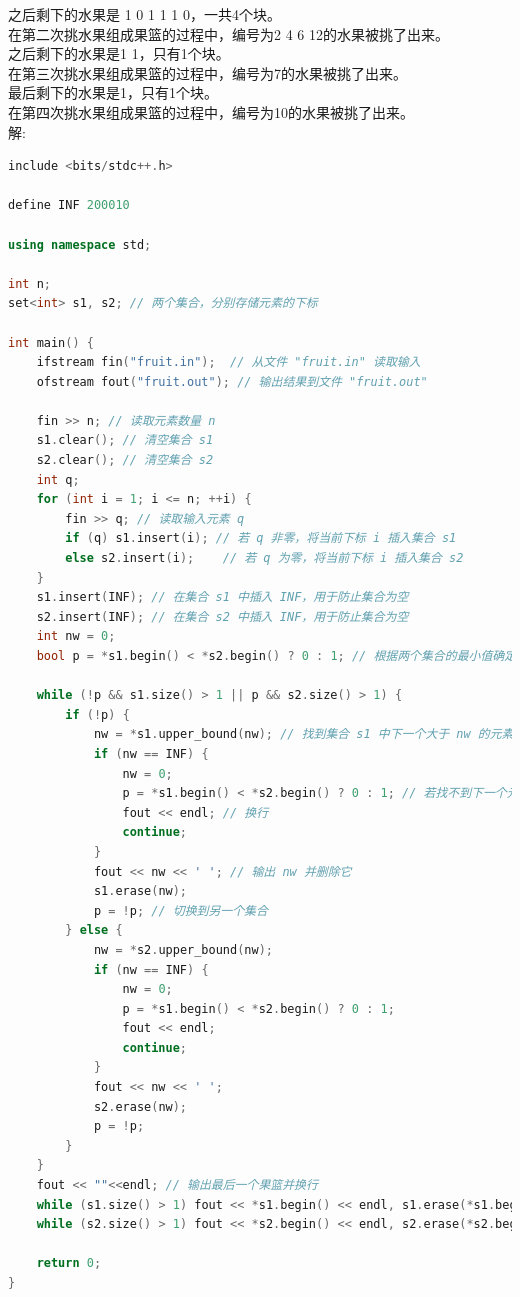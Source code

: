 \documentclass[12pt,twiside,a4paper]{ctexbook}
\numberwithin{chapter}{part}
\begin{document}
之后剩下的水果是 1 0 1 1 1 0，一共4个块。\\
在第二次挑水果组成果篮的过程中，编号为2 4 6 12的水果被挑了出来。\\
之后剩下的水果是1 1，只有1个块。\\
在第三次挑水果组成果篮的过程中，编号为7的水果被挑了出来。\\
最后剩下的水果是1，只有1个块。\\
在第四次挑水果组成果篮的过程中，编号为10的水果被挑了出来。\\
解:\\
\begin{lstlisting}[language=C++,breaklines = true]
include <bits/stdc++.h>

define INF 200010

using namespace std;

int n;
set<int> s1, s2; // 两个集合，分别存储元素的下标

int main() {
    ifstream fin("fruit.in");  // 从文件 "fruit.in" 读取输入
    ofstream fout("fruit.out"); // 输出结果到文件 "fruit.out"

    fin >> n; // 读取元素数量 n
    s1.clear(); // 清空集合 s1
    s2.clear(); // 清空集合 s2
    int q;
    for (int i = 1; i <= n; ++i) {
        fin >> q; // 读取输入元素 q
        if (q) s1.insert(i); // 若 q 非零，将当前下标 i 插入集合 s1
        else s2.insert(i);    // 若 q 为零，将当前下标 i 插入集合 s2
    }
    s1.insert(INF); // 在集合 s1 中插入 INF，用于防止集合为空
    s2.insert(INF); // 在集合 s2 中插入 INF，用于防止集合为空
    int nw = 0;
    bool p = *s1.begin() < *s2.begin() ? 0 : 1; // 根据两个集合的最小值确定 p 值，表示当前删的是哪个集合

    while (!p && s1.size() > 1 || p && s2.size() > 1) {
        if (!p) {
            nw = *s1.upper_bound(nw); // 找到集合 s1 中下一个大于 nw 的元素
            if (nw == INF) {
                nw = 0;
                p = *s1.begin() < *s2.begin() ? 0 : 1; // 若找不到下一个元素，重新确定 p 值
                fout << endl; // 换行
                continue;
            }
            fout << nw << ' '; // 输出 nw 并删除它
            s1.erase(nw);
            p = !p; // 切换到另一个集合
        } else {
            nw = *s2.upper_bound(nw);
            if (nw == INF) {
                nw = 0;
                p = *s1.begin() < *s2.begin() ? 0 : 1;
                fout << endl;
                continue;
            }
            fout << nw << ' ';
            s2.erase(nw);
            p = !p;
        }
    }
    fout << ""<<endl; // 输出最后一个果篮并换行
    while (s1.size() > 1) fout << *s1.begin() << endl, s1.erase(*s1.begin()); // 逐行输出 s1 剩余元素
    while (s2.size() > 1) fout << *s2.begin() << endl, s2.erase(*s2.begin()); // 逐行输出 s2 剩余元素

    return 0;
}
\end{lstlisting}
\end{document}
